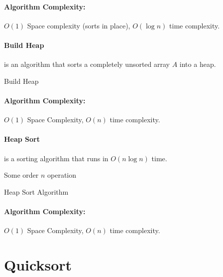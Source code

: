 \documentclass[a4paper,12pt]{report}
\DeclarePairedDelimiter{\floor}{\lfloor}{\rfloor}
\begin{document}
\paragraph{Algorithm Complexity: } $O(1)$ Space complexity (sorts in place), $O(\log n)$ time complexity.


\paragraph{Build Heap } is an algorithm that sorts a completely unsorted array $A$ into a heap. 

\begin{algorithm}[H]
\SetAlgoLined
{}
	\BlankLine
	\BlankLine
	
	\caption{Build Heap}
\end{algorithm}

\paragraph{Algorithm Complexity: } $O(1)$ Space Complexity, $O(n)$ time complexity.



\paragraph{Heap Sort } is a sorting algorithm that runs in $O(n\log n)$ time. 

\begin{algorithm}[H]
\SetAlgoLined
{}
	\BlankLine
	\BlankLine
	Some order $n$ operation\;
	\caption{Heap Sort Algorithm}
\end{algorithm}

\paragraph{Algorithm Complexity: } $O(1)$ Space Complexity, $O(n)$ time complexity.



\section{Quicksort}
\end{document}

